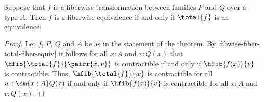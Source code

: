 %
\begin{thm}\label{thm:total-fiber-equiv}
Suppose that $f$ is a fiberwise transformation between families
$P$ and $Q$ over a type $A$.
Then $f$ is a fiberwise equivalence if and only if $\total{f}$ is an equivalence.
\end{thm}

\begin{proof}
Let $f$, $P$, $Q$ and $A$ be as in the statement of the theorem.
By \cref{fibwise-fiber-total-fiber-equiv} it follows for all
$x:A$ and $v:Q(x)$ that
$\hfib{\total{f}}{\pairr{x,v}}$ is contractible if and only if
$\hfib{f(x)}{v}$ is contractible.
Thus, $\hfib{\total{f}}{w}$ is contractible for all $w:\sm{x:A}Q(x)$ if and only if $\hfib{f(x)}{v}$ is contractible for all $x:A$ and $v:Q(x)$.
\end{proof}

